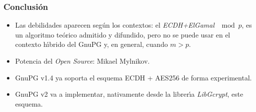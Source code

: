 \documentclass{beamer}
\theoremstyle{plain}        			%
\theoremstyle{definition}   			%
\theoremstyle{saltolinea}   			%
\begin{document}
\begin{frame}
\frametitle{Conclusi\'on}
	\pause
	\begin{itemize}[<+-| alert@+>]
		\item Las debilidades aparecen seg\'un los contextos: el \emph{ECDH+ElGamal} $\mod p$, es un algoritmo te\'orico admitido y difundido, pero no se puede usar en el contexto h\'{\i}brido del GnuPG y, en general, cuando $m>p$.
		\item Potencia del \emph{Open Source}: Mikael Mylnikov.
		\item GnuPG v1.4 ya soporta el esquema ECDH + AES256 de forma experimental.
		\item GnuPG v2 va a implementar, nativamente desde la librer\'{\i}a \emph{LibGcrypt}, este esquema.
	\end{itemize}
\end{frame}
\end{document}
